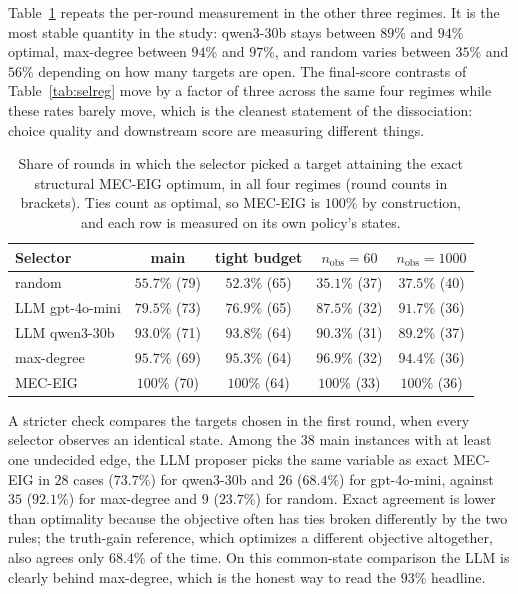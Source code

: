 \documentclass{article}
\begin{document}
Table~\ref{tab:roundreg} repeats the per-round measurement in the other three regimes. It is
the most stable quantity in the study: qwen3-30b stays between $89\%$ and $94\%$ optimal,
max-degree between $94\%$ and $97\%$, and random varies between $35\%$ and $56\%$ depending on
how many targets are open. The final-score contrasts of Table~\ref{tab:selreg} move by a
factor of three across the same four regimes while these rates barely move, which is the
cleanest statement of the dissociation: choice quality and downstream score are measuring
different things.

\begin{table}[h]
\caption{Share of rounds in which the selector picked a target attaining the exact structural
MEC-EIG optimum, in all four regimes (round counts in brackets). Ties count as optimal, so
MEC-EIG is $100\%$ by construction, and each row is measured on its own policy's states.}
\label{tab:roundreg}
\centering
\small
\begin{tabular}{lcccc}
\toprule
Selector & main & tight budget & $n_{\mathrm{obs}}{=}60$ & $n_{\mathrm{obs}}{=}1000$ \\
\midrule
random & $55.7\%$ (79) & $52.3\%$ (65) & $35.1\%$ (37) & $37.5\%$ (40) \\
LLM gpt-4o-mini & $79.5\%$ (73) & $76.9\%$ (65) & $87.5\%$ (32) & $91.7\%$ (36) \\
LLM qwen3-30b & $93.0\%$ (71) & $93.8\%$ (64) & $90.3\%$ (31) & $89.2\%$ (37) \\
max-degree & $\mathbf{95.7\%}$ (69) & $\mathbf{95.3\%}$ (64) & $\mathbf{96.9\%}$ (32) & $\mathbf{94.4\%}$ (36) \\
MEC-EIG & $100\%$ (70) & $100\%$ (64) & $100\%$ (33) & $100\%$ (36) \\
\bottomrule
\end{tabular}
\end{table}

A stricter check compares the targets chosen in the first round, when every selector observes
an identical state. Among the 38 main instances with at least one undecided edge, the LLM
proposer picks the same variable as exact MEC-EIG in $28$ cases ($73.7\%$) for qwen3-30b and
$26$ ($68.4\%$) for gpt-4o-mini, against $35$ ($92.1\%$) for max-degree and $9$ ($23.7\%$) for
random. Exact agreement is lower than optimality because the objective often has ties broken
differently by the two rules; the truth-gain reference, which optimizes a different objective
altogether, also agrees only $68.4\%$ of the time. On this common-state comparison the LLM is
clearly behind max-degree, which is the honest way to read the $93\%$ headline.
\end{document}
